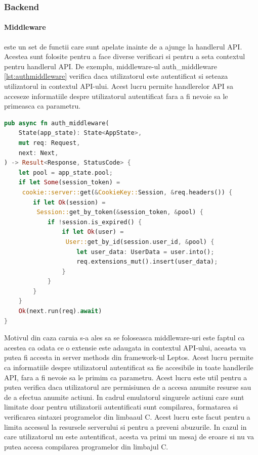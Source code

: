 \documentclass[titlepage,12pt]{article}
\DeclareRobustCommand{\code}[1]{{\ttfamily\small #1}}
\begin{document}
\subsubsection{Backend}

\paragraph{Middleware} este un set de functii care sunt apelate inainte de a ajunge la handlerul API. Acestea sunt folosite pentru a face diverse verificari si pentru a seta contextul pentru handlerul API. De exemplu, middleware-ul \code{auth\_middleware} \cref{lst:authmiddleware} verifica daca utilizatorul este autentificat si seteaza utilizatorul in contextul API-ului. Acest lucru permite handlerelor API sa acceseze informatiile despre utilizatorul autentificat fara a fi nevoie sa le primeasca ca parametru.

\begin{lstlisting}[language=Rust,caption={Middleware pentru autentificare},label={lst:authmiddleware}]
pub async fn auth_middleware(
    State(app_state): State<AppState>,
    mut req: Request,
    next: Next,
) -> Result<Response, StatusCode> {
    let pool = app_state.pool;
    if let Some(session_token) =
     cookie::server::get(&CookieKey::Session, &req.headers()) {
        if let Ok(session) =
         Session::get_by_token(&session_token, &pool) {
            if !session.is_expired() {
                if let Ok(user) =
                 User::get_by_id(session.user_id, &pool) {
                    let user_data: UserData = user.into();
                    req.extensions_mut().insert(user_data);
                }
            }
        }
    }
    Ok(next.run(req).await)
}
\end{lstlisting}

Motivul din caza caruia s-a ales sa se foloseasca middleware-uri este faptul ca acestea ca odata ce o extensie este adaugata in contextul API-ului, aceasta va putea fi accesta in \code{server methods} din framework-ul Leptos. Acest lucru permite ca informatiile despre utilizatorul autentificat sa fie accesibile in toate handlerile API, fara a fi nevoie sa le primim ca parametru. Acest lucru este util pentru a putea verifica daca utilizatorul are permisiunea de a accesa anumite resurse sau de a efectua anumite actiuni. In cadrul emulatorul singurele actiuni care sunt limitate doar pentru utilizatorii autentificati sunt compilarea, formatarea si verificarea sintaxei programelor din limbaaul C. Acest lucru este facut pentru a limita accessul la resursele serverului si pentru a preveni abuzurile. In cazul in care utilizatorul nu este autentificat, acesta va primi un mesaj de eroare si nu va putea accesa compilarea programelor din limbajul C.
\end{document}
